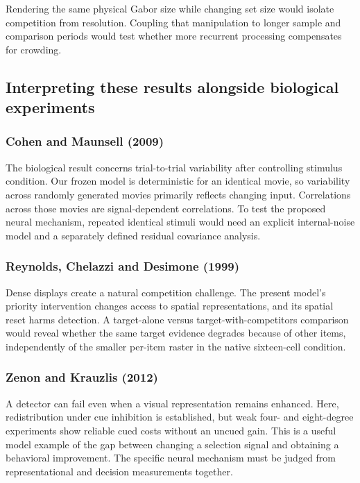 \documentclass[11pt]{article}
\begin{document}
Rendering the same physical Gabor size while changing set size would isolate competition from resolution. Coupling that manipulation to longer sample and comparison periods would test whether more recurrent processing compensates for crowding.

\subsection{Interpreting these results alongside biological experiments}
\subsubsection{Cohen and Maunsell (2009)}
The biological result concerns trial-to-trial variability after controlling stimulus condition. Our frozen model is deterministic for an identical movie, so variability across randomly generated movies primarily reflects changing input. Correlations across those movies are signal-dependent correlations. To test the proposed neural mechanism, repeated identical stimuli would need an explicit internal-noise model and a separately defined residual covariance analysis. \cite{bio_cohen}

\subsubsection{Reynolds, Chelazzi and Desimone (1999)}
Dense displays create a natural competition challenge. The present model’s priority intervention changes access to spatial representations, and its spatial reset harms detection. A target-alone versus target-with-competitors comparison would reveal whether the same target evidence degrades because of other items, independently of the smaller per-item raster in the native sixteen-cell condition. \cite{bio_competition}

\subsubsection{Zenon and Krauzlis (2012)}
A detector can fail even when a visual representation remains enhanced. Here, redistribution under cue inhibition is established, but weak four- and eight-degree experiments show reliable cued costs without an uncued gain. This is a useful model example of the gap between changing a selection signal and obtaining a behavioral improvement. The specific neural mechanism must be judged from representational and decision measurements together. \cite{bio_zenon}
\end{document}
